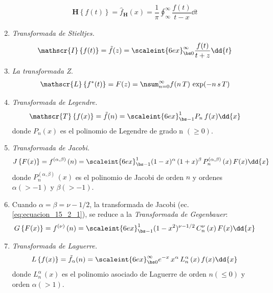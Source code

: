 \begin{enumerate}
\begin{align}
\mathbf{H} \left\{ f(t) \right\} = \hat{f}_{\mathbf{H}} (x) = \dfrac{1}{\pi} \oint_{\infty}^{\infty} \dfrac{f(t)}{t - x} \dd{t}
\label{eq:ecuacion_9_2_1}
\end{align}
\item \emph{Transformada de Stieltjes.}
\begin{align}
\mathscr{I} \left\{ f(t) \right\} = \tilde{f} (z) = \scaleint{6ex}_{\bs 0}^{\infty} \dfrac{f(t)}{t + z} \dd{t}
\label{eq:ecuacion_9_7_2}
\end{align}
\item \emph{La transformada Z.}
\begin{align}
\mathscr{L} \left\{ f^{*} (t) \right\} = F(z) = \nsum_{n=0}^{\infty} f( n\, T) \, \exp(- n \, s \, T)
\label{eq:ecuacion_12_3_1}
\end{align}
\item \emph{Transformada de Legendre.}
\begin{align}
\mathscr{T} \left\{ f(x) \right\} = \tilde{f} (n) = \scaleint{6ex}_{\bs -1}^{1} P_{n} \, f(x) \dd{x}
\label{eq:ecuacion_14_2_1}
\end{align}
donde $P_{n}(x)$ es el polinomio de Legendre de grado n $(\geq 0)$.
\item \emph{Transformada de Jacobi.}
\begin{align}
J \left\{ F(x) \right\} = f^{(\alpha, \beta)} \, (n) = \scaleint{6ex}_{\bs -1}^{1} (1 - x)^{\alpha} \, (1 + x)^{\beta} \, P_{n}^{(\alpha, \beta)} \, (x) \, F(x) \dd{x}
\label{eq:ecuacion_15_2_1}
\end{align}
donde $P_{n}^{(\alpha, \beta)} \, (x)$ es el polinomio de Jacobi de orden $n$ y ordenes $\alpha (> -1)$ y $\beta (> -1)$.
\item Cuando $\alpha = \beta = \nu - 1/2$, la transformada de Jacobi (ec. \ref{eq:ecuacion_15_2_1}), se reduce a la \emph{Transformada de Gegenbauer}:
\begin{align}
G \left\{ F(x) \right\} = f^{(\nu)} \, (n) = \scaleint{6ex}_{\bs -1}^{1} (1 - x^{2})^{\nu - 1/2} \, C_{n}^{\nu} \, (x) \, F(x) \dd{x}
\label{eq:ecuacion_15_2_4}
\end{align}
\item \emph{Transformada de Laguerre.}
\begin{align}
L \left\{ f(x) \right\} = \tilde{f}_{\alpha} (n) = \scaleint{6ex}_{\bs 0}^{\infty} e^{-x} \, x^{\alpha} \, L_{n}^{\alpha} \, (x) \, f(x) \dd{x}
\label{eq:ecuacion_16_2_1}
\end{align}
donde $L_{n}^{\alpha} \, (x)$ es el polinomio asociado de Laguerre de orden $n (\leq 0)$ y orden $\alpha (> 1)$.

\end{enumerate}
